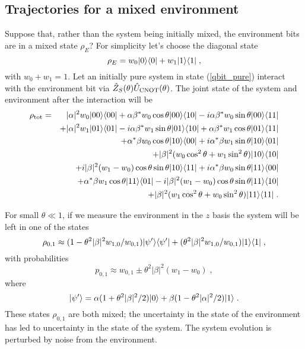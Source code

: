 \subsection{Trajectories for a mixed environment}

Suppose that, rather than the system being initially mixed, the environment
bits are in a mixed state $\rho_E$?  For simplicity let's choose
the diagonal state
\begin{equation}
\rho_E = w_0 {| 0 \rangle}{\langle 0 |} + w_1 {| 1 \rangle}{\langle 1 |} \;,
\end{equation}
with $w_0+w_1=1$.  Let an initially pure system in state (\ref{qbit_pure})
interact with the environment bit via
${\hat Z}_S(\theta){\hat U}_{\rm CNOT}(\theta)$.  The joint
state of the system and environment after the interaction will be
\begin{eqnarray}
\rho_{\rm tot} &=& |\alpha|^2 w_0 {| 00 \rangle}{\langle 00 |} +
 \alpha\beta^* w_0 \cos\theta {| 00 \rangle}{\langle 10 |} -
 i \alpha\beta^* w_0 \sin\theta {| 00 \rangle}{\langle 11 |} \nonumber\\
&& + |\alpha|^2 w_1 {| 01 \rangle}{\langle 01 |} -
 i \alpha\beta^* w_1 \sin\theta {| 01 \rangle}{\langle 10 |} +
 \alpha\beta^* w_1 \cos\theta {| 01 \rangle}{\langle 11 |} \nonumber\\
&& + \alpha^*\beta w_0 \cos\theta {| 10 \rangle}{\langle 00 |} +
 i \alpha^*\beta w_1 \sin\theta {| 10 \rangle}{\langle 01 |} \nonumber\\
&& + |\beta|^2(w_0 \cos^2\theta + w_1\sin^2\theta) {| 10 \rangle}{\langle 10 |} \nonumber\\
&& + i |\beta|^2(w_1 - w_0) \cos\theta\sin\theta {| 10 \rangle}{\langle 11 |} +
 i \alpha^*\beta w_0 \sin\theta {| 11 \rangle}{\langle 00 |} \nonumber\\
&& + \alpha^*\beta w_1 \cos\theta {| 11 \rangle}{\langle 01 |}
 - i |\beta|^2(w_1 - w_0) \cos\theta\sin\theta {| 11 \rangle}{\langle 10 |} \nonumber\\
&& + |\beta|^2(w_1 \cos^2\theta + w_0\sin^2\theta) {| 11 \rangle}{\langle 11 |} \;.
\end{eqnarray}

For small $\theta\ll1$, if we measure the environment in the $z$ basis
the system will be left in one of the states
\begin{equation}
\rho_{0,1} \approx
  (1-\theta^2|\beta|^2 w_{1,0}/w_{0,1}) {| \psi' \rangle}{\langle \psi' |}
  + (\theta^2|\beta|^2 w_{1,0}/w_{0,1}) {| 1 \rangle}{\langle 1 |} \;,
\end{equation}
with probabilities
\begin{equation}
p_{0,1} \approx w_{0,1} \pm \theta^2|\beta|^2(w_1 - w_0) \;,
\label{mixed_probs}
\end{equation}
where
\begin{equation}
{| \psi' \rangle} = \alpha(1 + \theta^2|\beta|^2/2) {| 0 \rangle} + 
 \beta(1 - \theta^2|\alpha|^2/2) {| 1 \rangle} \;.
\end{equation}
These states $\rho_{0,1}$ are both mixed; the uncertainty in the
state of the environment has led to uncertainty in the state of the
system.  The system evolution is perturbed by noise from the
environment.

